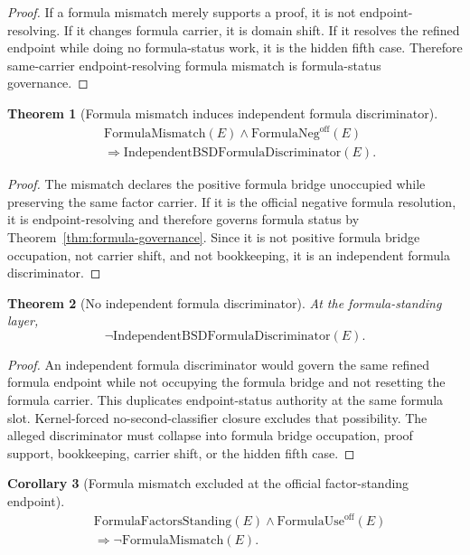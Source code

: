 \documentclass[11pt]{article}
\newtheorem{theorem}{Theorem}[section]
\newtheorem{corollary}[theorem]{Corollary}
\newcommand{\FormulaMismatch}{\mathrm{FormulaMismatch}}
\newcommand{\FormulaUse}{\mathrm{FormulaUse}^{\mathrm{off}}}
\newcommand{\FormulaNeg}{\mathrm{FormulaNeg}^{\mathrm{off}}}
\begin{document}
\begin{proof}
If a formula mismatch merely supports a proof, it is not endpoint-resolving. If it changes formula carrier, it is domain shift. If it resolves the refined endpoint while doing no formula-status work, it is the hidden fifth case. Therefore same-carrier endpoint-resolving formula mismatch is formula-status governance.
\end{proof}

\begin{theorem}[Formula mismatch induces independent formula discriminator]\label{thm:formula-disc}
\[
\begin{aligned}
&\FormulaMismatch(E)\wedge \FormulaNeg(E)\\
&\Rightarrow \mathrm{IndependentBSDFormulaDiscriminator}(E).
\end{aligned}
\]
\end{theorem}

\begin{proof}
The mismatch declares the positive formula bridge unoccupied while preserving the same factor carrier. If it is the official negative formula resolution, it is endpoint-resolving and therefore governs formula status by Theorem~\ref{thm:formula-governance}. Since it is not positive formula bridge occupation, not carrier shift, and not bookkeeping, it is an independent formula discriminator.
\end{proof}

\begin{theorem}[No independent formula discriminator]\label{thm:no-formula-disc}
At the formula-standing layer,
\[
\neg\mathrm{IndependentBSDFormulaDiscriminator}(E).
\]
\end{theorem}

\begin{proof}
An independent formula discriminator would govern the same refined formula endpoint while not occupying the formula bridge and not resetting the formula carrier. This duplicates endpoint-status authority at the same formula slot. Kernel-forced no-second-classifier closure excludes that possibility. The alleged discriminator must collapse into formula bridge occupation, proof support, bookkeeping, carrier shift, or the hidden fifth case.
\end{proof}

\begin{corollary}[Formula mismatch excluded at the official factor-standing endpoint]\label{cor:formula-mismatch-excluded}
\[
\begin{aligned}
&\mathrm{FormulaFactorsStanding}(E)\wedge \FormulaUse(E)\\
&\Rightarrow \neg\FormulaMismatch(E).
\end{aligned}
\]
\end{corollary}
\end{document}
